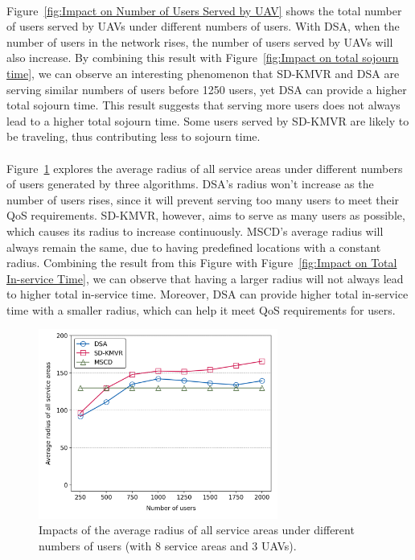 \documentclass[a4paper,12pt]{report}
\begin{document}
\paragraph{}
Figure~\ref{fig:Impact on Number of Users Served by UAV} shows the total number of users served by UAVs under different numbers of users. With DSA, when the number of users in the network rises, the number of users served by UAVs will also increase. By combining this result with Figure~\ref{fig:Impact on total sojourn time}, we can observe an interesting phenomenon that SD-KMVR and DSA are serving similar numbers of users before 1250 users, yet DSA can provide a higher total sojourn time. This result suggests that serving more users does not always lead to a higher total sojourn time. Some users served by SD-KMVR are likely to be traveling, thus contributing less to sojourn time.
\paragraph{}
Figure~\ref{fig:Impact on average radius} explores the average radius of all service areas under different numbers of users generated by three algorithms. DSA's radius won't increase as the number of users rises, since it will prevent serving too many users to meet their QoS requirements. SD-KMVR, however, aims to serve as many users as possible, which causes its radius to increase continuously. MSCD's average radius will always remain the same, due to having predefined locations with a constant radius. Combining the result from this Figure with Figure~\ref{fig:Impact on Total In-service Time}, we can observe that having a larger radius will not always lead to higher total in-service time. Moreover, DSA can provide higher total in-service time with a smaller radius, which can help it meet QoS requirements for users.
\begin{figure} [h!]
    \centering
    \includegraphics[width=0.7\textwidth]{Figure 9.png}
    \caption{Impacts of the average radius of all service areas under different numbers of users (with 8 service areas and 3 UAVs).}
    \label{fig:Impact on average radius}
\end{figure}
\end{document}
